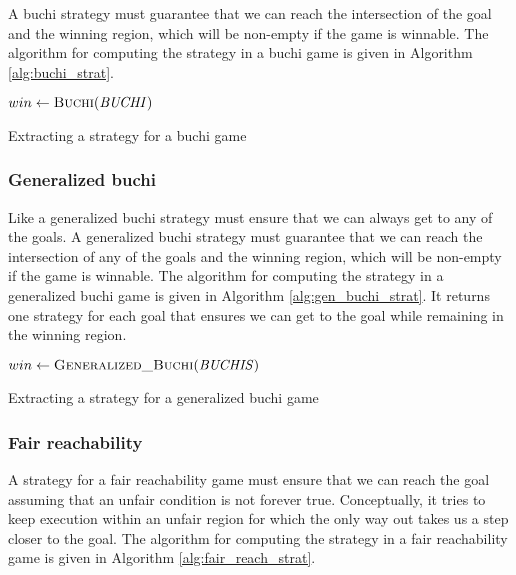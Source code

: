 A buchi strategy must guarantee that we can reach the intersection of the goal and the winning region, which will be non-empty if the game is winnable. The algorithm for computing the strategy in a buchi game is given in Algorithm \ref{alg:buchi_strat}.

\begin{algorithm}[t]
\begin{algorithmic}
\State $win \gets \Call{Buchi}{\buchiobj}$
\State \Return {}
\EndFunction
\end{algorithmic}
\caption{Extracting a strategy for a buchi game}
\label{alg:buchi_strat}
\end{algorithm}

\subsubsection{Generalized buchi}

Like a generalized buchi strategy must ensure that we can always get to any of the goals. A generalized buchi strategy must guarantee that we can reach the intersection of any of the goals and the winning region, which will be non-empty if the game is winnable. The algorithm for computing the strategy in a generalized buchi game is given in Algorithm \ref{alg:gen_buchi_strat}. It returns one strategy for each goal that ensures we can get to the goal while remaining in the winning region. 

\begin{algorithm}[t]
\begin{algorithmic}
\State $win \gets \Call{Generalized\_Buchi}{\genbuchiobj}$

\State \Return {}
\EndFor

\EndFunction
\end{algorithmic}
\caption{Extracting a strategy for a generalized buchi game}
\label{alg:gen_buchi_strat}
\end{algorithm}

\subsubsection{Fair reachability}

A strategy for a fair reachability game must ensure that we can reach the goal assuming that an unfair condition is not forever true. Conceptually, it tries to keep execution within an unfair region for which the only way out takes us a step closer to the goal. The algorithm for computing the strategy in a fair reachability game is given in Algorithm \ref{alg:fair_reach_strat}.

